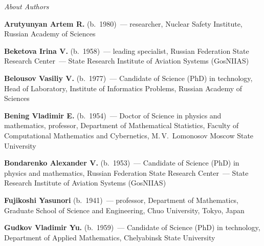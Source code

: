 \begin{center}\LARGE
\textit{About Authors}
\end{center}
\thispagestyle{empty}

\vspace*{24pt}

\begin{multicols}{2}

\noindent
\textbf{Arutyunyan Artem R.} (b.\ 1980)~--- researcher, Nuclear Safety Institute, Russian Academy of Sciences


\noindent
\textbf{Beketova Irina V.} (b.\ 1958)~--- leading specialist,
Russian Federation State Research Center~--- State Research
Institute of Aviation Systems (GosNIIAS) 


\noindent
\textbf{Belousov Vasiliy V.} (b.\ 1977)~--- Candidate of Science (PhD) in technology, 
Head of Laboratory, Institute of Informatics Problems, Russian Academy of Sciences


\noindent
\textbf{Bening Vladimir E.} (b.\ 1954)~--- Doctor of Science in physics and mathematics, 
professor, Department of Mathematical Statistics, Faculty of Computational 
Mathematics and Cybernetics, M.\,V.~Lomonosov Moscow State University


\noindent
\textbf{Bondarenko Alexander V.} (b.\ 1953)~--- Candidate of Science (PhD) in physics and mathematics,
Russian Federation State Research Center~--- State Research
Institute of Aviation Systems (GosNIIAS)


\noindent
\textbf{Fujikoshi Yasunori} (b.\ 1941)~--- professor, 
Department of Mathematics, Graduate School of Science and Engineering,
Chuo University, Tokyo, Japan


\noindent
\textbf{Gudkov Vladimir Yu.} (b.\ 1959)~--- Candidate of Science (PhD) in technology,  
Department of Applied Mathematics, Chelyabinsk State University



\end{multicols}
